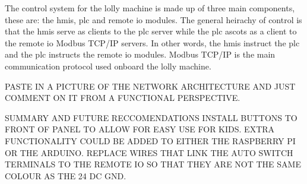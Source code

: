         The control system for the lolly machine is made up of three main components, these are: the \acrshort{hmi}s, \acrshort{plc} and remote \acrshort{io} modules. The general heirachy of control is that the \acrshort{hmi}s serve as clients to the \acrshort{plc} server while the \acrshort{plc} ascots as a client to the remote \acrshort{io} Modbus TCP/IP servers. In other words, the \acrshort{hmi}s instruct the \acrshort{plc} and the \acrshort{plc} instructs the remote \acrshort{io} modules. Modbus TCP/IP is the main communication protocol used onboard the lolly machine. 
    
        PASTE IN A PICTURE OF THE NETWORK ARCHITECTURE AND JUST COMMENT ON IT FROM A FUNCTIONAL PERSPECTIVE.
    
        SUMMARY AND FUTURE RECCOMENDATIONS
        INSTALL BUTTONS TO FRONT OF PANEL TO ALLOW FOR EASY USE FOR KIDS.
        EXTRA FUNCTIONALITY COULD BE ADDED TO EITHER THE RASPBERRY PI OR THE ARDUINO.
        REPLACE WIRES THAT LINK THE AUTO SWITCH TERMINALS TO THE REMOTE IO SO THAT THEY ARE NOT THE SAME COLOUR AS THE 24 DC GND.
    
    
    
    